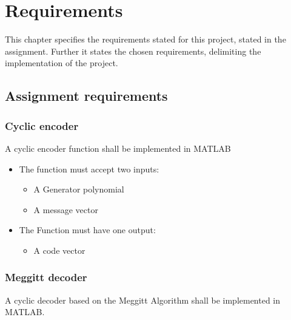 \documentclass[MiniProjectMain]{subfiles}
\begin{document}
\chapter{Requirements}
This chapter specifies the requirements stated for this project, stated in the assignment.
Further it states the chosen requirements, delimiting the implementation of the project.

\section{Assignment requirements}
\subsection{Cyclic encoder}
A cyclic encoder function shall be implemented in MATLAB

\begin{itemize}

\item 
The function must accept two inputs:

	\begin{itemize}
	\item A Generator polynomial
	\item A message vector
	\end{itemize}

\item The Function must have one output:

	\begin{itemize}
	\item A code vector
	\end{itemize}
	
\end{itemize}

\subsection{Meggitt decoder}
A cyclic decoder based on the Meggitt Algorithm shall be implemented in MATLAB.
\end{document}
